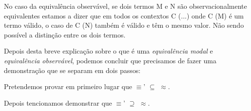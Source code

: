 \documentclass[11pt,a4paper]{report}
\begin{document}
No caso da equivalência observável, se dois termos M e N são observacionalmente equivalentes estamos a dizer que em todos os contextos C (...) onde C (M) é um termo válido, o caso de C (N) também é válido e têm o mesmo valor. Não sendo possível a distinção entre os dois termos.

Depois desta breve explicação sobre o que é uma \emph{equivalência modal} e \emph{equivalência observável}, podemos concluir que precisamos de fazer uma demonstração que se separam em dois passos:

Pretendemos provar em primeiro lugar que $\equiv$' $\subseteq$ $\approx$.

Depois tencionamos demonstrar que $\equiv$' $\supseteq$ $\approx$.
\end{document}
